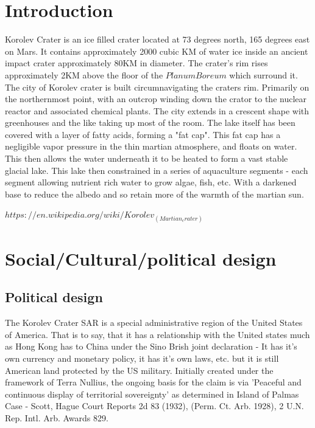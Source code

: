 \documentclass[10pt]{article}
\begin{document}
\section*{Introduction}
Korolev Crater is an ice filled crater located at 73 degrees north, 165 degrees east on Mars. It contains approximately 2000 cubic KM of water ice inside an ancient impact crater approximately 80KM in diameter. The crater's rim rises approximately 2KM above the floor of the $Planum Boreum$ which surround it. The city of Korolev crater is built circumnavigating the craters rim. Primarily on the northernmost point, with an outcrop winding down the crator to the nuclear reactor and associated chemical plants. The city extends in a crescent shape with greenhouses and the like taking up most of the room. The lake itself has been covered with a layer of fatty acids, forming a "fat cap". This fat cap has a negligible vapor pressure in the thin martian atmosphere, and floats on water. This then allows the water underneath it to be heated to form a vast stable glacial lake. This lake then constrained in a series of aquaculture segments - each segment allowing nutrient rich water to grow algae, fish, etc. With a darkened base to reduce the albedo and so retain more of the warmth of the martian sun.

$https://en.wikipedia.org/wiki/Korolev_(Martian_crater)$
\section*{Social/Cultural/political design}

\subsection*{Political design}
The Korolev Crater SAR is a special administrative region of the United States of America. That is to say, that it has a relationship with the United states much as Hong Kong has to China under the Sino Brish joint declaration - It has it's own currency and monetary policy, it has it's own laws, etc. but it is still American land protected by the US military. Initially created under the framework of Terra Nullius, the ongoing basis for the claim is via 'Peaceful and continuous display of territorial sovereignty' as determined in Island of Palmas Case - Scott, Hague Court Reports 2d 83 (1932), (Perm. Ct. Arb. 1928), 2 U.N. Rep. Intl. Arb. Awards 829. 
\end{document}
